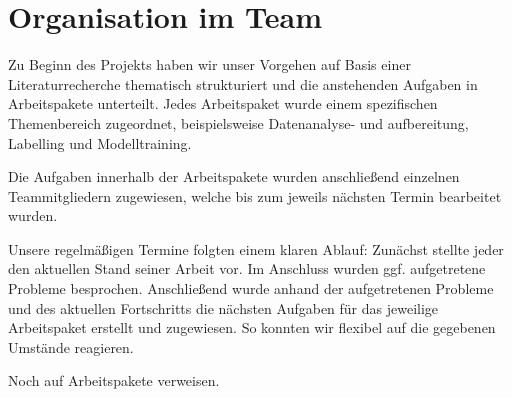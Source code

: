 \chapter{Organisation im Team}

Zu Beginn des Projekts haben wir unser Vorgehen auf Basis einer Literaturrecherche thematisch 
strukturiert und die anstehenden Aufgaben in Arbeitspakete unterteilt. Jedes Arbeitspaket wurde 
einem spezifischen Themenbereich zugeordnet, beispielsweise Datenanalyse- und aufbereitung, 
Labelling und Modelltraining.

Die Aufgaben innerhalb der Arbeitspakete wurden anschließend einzelnen Teammitgliedern 
zugewiesen, welche bis zum jeweils nächsten Termin bearbeitet wurden.

Unsere regelmäßigen Termine folgten einem klaren Ablauf: Zunächst stellte 
jeder den aktuellen Stand seiner Arbeit vor. Im Anschluss wurden ggf. aufgetretene Probleme 
besprochen. Anschließend wurde anhand der aufgetretenen Probleme und des aktuellen Fortschritts 
die nächsten Aufgaben für das jeweilige Arbeitspaket erstellt und zugewiesen. So konnten wir 
flexibel auf die gegebenen Umstände reagieren. 


Noch auf Arbeitspakete verweisen. 